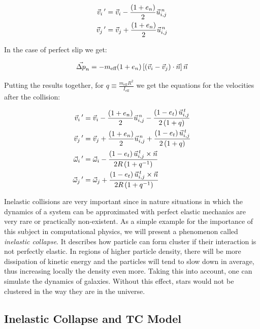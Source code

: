 \begin{align}
\vec{v}_{i} \,' &= \vec{v}_{i} - \frac{\left(1+e_n\right) }{2}\vec{u}_{i,j}^{\,n}\\
\vec{v}_{j} \,' &= \vec{v}_{j} + \frac{\left(1+e_n\right) }{2}\vec{u}_{i,j}^{\,n}
\end{align}

In the case of perfect slip we get:

\begin{equation}
\vec{\Delta p}_{n} = -m_{\text{eff}}(1+e_n)\left[\left(\vec{v}_{i}-\vec{v}_{j}\right)\cdot\vec{n}\right]\vec{n}
\end{equation}




Putting the results together, for $q\equiv\frac{m_{\text{eff}}R^2}{I_{\text{eff}}}$ we get the equations for the velocities after the collision:


\begin{align}
\vec{v}_{i} \,' &= \vec{v}_{i} - \frac{\left(1+e_n\right)  }{2} \vec{u}_{i,j}^{\,n} -  \frac{\left(1-e_t\right) \vec{u}_{i,j}^{\,t} }{2\left(1+q\right)} \\ 
\vec{v}_{j} \,' &= \vec{v}_{j} + \frac{\left(1+e_n\right)  }{2} \vec{u}_{i,j}^{\,n} +  \frac{\left(1-e_t\right) \vec{u}_{i,j}^{\,t} }{2\left(1+q\right)} \\ 
\vec{\omega}_{i}\,' &= \vec{\omega}_{i} - \frac{\left(1-e_t\right) \vec{u}_{i,j}^{\,t}\times\vec{n} }{2R\left(1+q^{-1} \right)} \\
\vec{\omega}_{j}\,' &= \vec{\omega}_{j} + \frac{\left(1-e_t\right) \vec{u}_{i,j}^{\,t}\times\vec{n} }{2R\left(1+q^{-1} \right)} 
\end{align}


Inelastic collisions are very important since in nature situations in which the dynamics of a system can be approximated with perfect elastic mechanics are very rare or practically non-existent. As a simple example for the importance of this subject in computational physics, we will present a phenomenon called \emph{inelastic collapse}. It describes how particle can form cluster if their interaction is not perfectly elastic. In regions of higher particle density, there will be more dissipation of kinetic energy and the particles will tend to slow down in average, thus increasing locally the density even more. Taking this into account, one can simulate the dynamics of galaxies. Without this effect, stars would not be clustered in the way they are in the universe.

\subsection{Inelastic Collapse and TC Model}
\label{sec:collapse}


